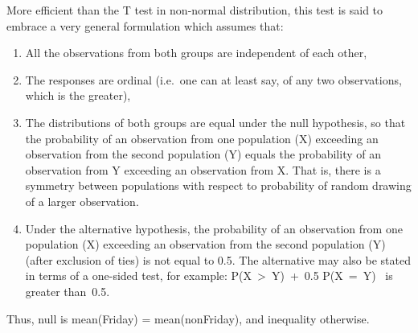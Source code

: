 \documentclass[letterpaper,10pt,english]{/Users/edwsurewin/anaconda/lib/python2.7/site-packages/sphinx/texinputs/sphinxhowto}
\begin{document}
More efficient than the T test in non-normal distribution, this test is
said to embrace a very general formulation which assumes that:

\begin{enumerate}
\def\labelenumi{\arabic{enumi}.}
\itemsep1pt\parskip0pt
\item
  All the observations from both groups are independent of each other,
\item
  The responses are ordinal (i.e.~one can at least say, of any two
  observations, which is the greater),
\item
  The distributions of both groups are equal under the null hypothesis,
  so that the probability of an observation from one population (X)
  exceeding an observation from the second population (Y) equals the
  probability of an observation from Y exceeding an observation from X.
  That is, there is a symmetry between populations with respect to
  probability of random drawing of a larger observation.
\item
  Under the alternative hypothesis, the probability of an observation
  from one population (X) exceeding an observation from the second
  population (Y) (after exclusion of ties) is not equal to 0.5. The
  alternative may also be stated in terms of a one-sided test, for
  example: P(X~\textgreater{}~Y)~+~0.5 P(X~=~Y) ~is greater than~0.5.
\end{enumerate}

Thus, null is mean(Friday) = mean(nonFriday), and inequality otherwise.

\end{document}
